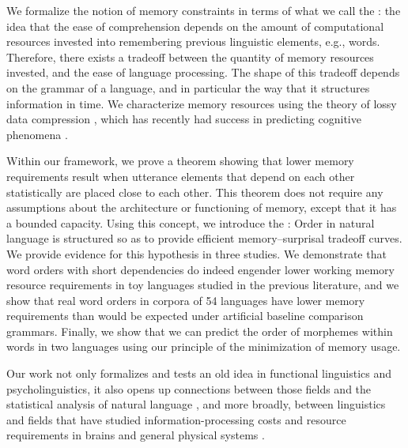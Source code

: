 We formalize the notion of memory constraints in terms of what we call the : the idea that the ease of comprehension depends on the amount of computational resources invested into remembering previous linguistic elements, e.g., words. 
Therefore, there exists a tradeoff between the quantity of memory resources invested, and the ease of language processing.
The shape of this tradeoff depends on the grammar of a language, and in particular the way that it structures information in time.
We characterize memory resources using the theory of lossy data compression \citep{cover2006elements,berger2003rate}, which has recently had success in predicting cognitive phenomena \citep{sims2018efficient,zenon2019information}.%

Within our framework, we prove a theorem showing that lower memory requirements result when utterance elements that depend on each other statistically are placed close to each other. 
This theorem does not require any assumptions about the architecture or functioning of memory, except that it has a bounded capacity.
Using this concept, we introduce the : Order in natural language is structured so as to provide efficient memory--surprisal tradeoff curves.
We provide evidence for this hypothesis in three studies.
We demonstrate that word orders with short dependencies do indeed engender lower working memory resource requirements in toy languages studied in the previous literature, and we show that real word orders in corpora of 54 languages have lower memory requirements than would be expected under artificial baseline comparison grammars. 
Finally, we show that we can predict the order of morphemes within words in two languages using our principle of the minimization of memory usage.

Our work not only formalizes and tests an old idea in functional linguistics and psycholinguistics, it also opens up connections between those fields and the statistical analysis of natural language \citep{debowski-excess-2011,bentz2017word,lin-critical-2017}, and more broadly, between linguistics and fields that have studied information-processing costs and resource requirements in brains \citep[e.g.,][]{friston2010free} and general physical systems \citep[e.g.,][]{still2012thermodynamic}. 





